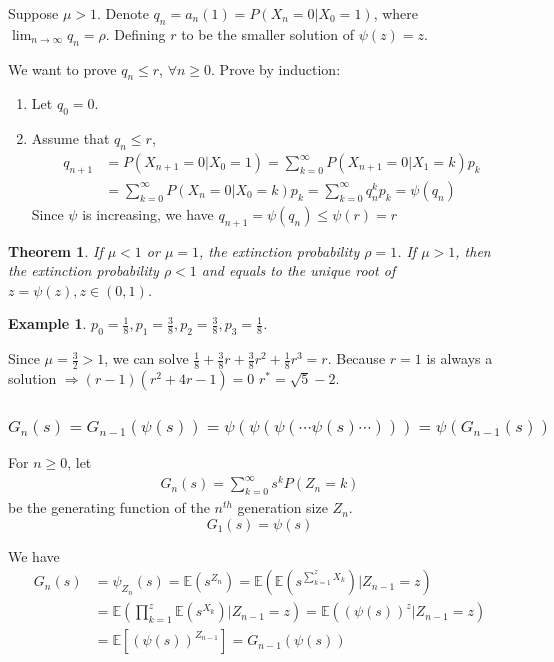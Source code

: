 \documentclass[11pt,a4paper]{article}
\newtheorem{theorem}{Theorem}
\newtheorem{example}{Example}
\begin{document}
Suppose $\mu>1$. Denote $q_n=a_n(1)=P(X_n=0|X_0=1)$, where $\lim_{n \rightarrow \infty}q_n=\rho$. Defining $r$ to be the smaller solution of $\psi(z)=z$.

We want to prove $q_n\leq r$, $\forall n\geq 0$. Prove by induction:
\begin{enumerate}
    \item Let $q_0=0$.
    \item Assume that $q_n\leq r$,
    \begin{equation}
        \begin{aligned}
            q_{n+1}&=P(X_{n+1}=0|X_0=1)=\sum_{k=0}^\infty P(X_{n+1}=0|X_1=k)p_k\\&=\sum_{k=0}^\infty P(X_{n}=0|X_0=k)p_k=\sum_{k=0}^\infty q_n^k p_k=\psi(q_n)
        \end{aligned}
        \nonumber
    \end{equation}
    Since $\psi$ is increasing, we have $q_{n+1}=\psi(q_n)\leq \psi(r)=r$
\end{enumerate}

\begin{theorem}
    If $\mu<1$ or $\mu=1$, the extinction probability $\rho=1$. If $\mu>1$, then the extinction probability $\rho<1$ and equals to the unique root of $z=\psi(z),z\in (0,1)$.
\end{theorem}

\begin{example}
    $p_0=\frac{1}{8},p_1=\frac{3}{8},p_2=\frac{3}{8},p_3=\frac{1}{8}$.
\end{example}
Since $\mu=\frac{3}{2}>1$, we can solve $\frac{1}{8}+\frac{3}{8}r+\frac{3}{8}r^2+\frac{1}{8}r^3=r$. Because $r=1$ is always a solution $\Rightarrow (r-1)(r^2+4r-1)=0$ $r^*=\sqrt{5}-2$.

\subsubsection{$G_n(s)=G_{n-1}(\psi(s))=\psi(\psi(\psi(\cdots\psi(s)\cdots)))=\psi(G_{n-1}(s))$}
For $n\geq 0$, let
\begin{equation}
    \begin{aligned}
        G_n(s)=\sum_{k=0}^\infty s^k P(Z_n=k)
    \end{aligned}
    \nonumber
\end{equation}
be the generating function of the $n^{th}$ generation size $Z_n$. $$G_1(s)=\psi(s)$$

We have
\begin{equation}
    \begin{aligned}
        G_n(s)&=\psi_{Z_n}(s)=\mathbb{E}(s^{Z_n})= \mathbb{E}\left(\mathbb{E}(s^{\sum_{k=1}^{z}X_k})|Z_{n-1}=z\right)\\
        &=\mathbb{E}\left(\prod_{k=1}^{z}\mathbb{E}(s^{X_k})|Z_{n-1}=z\right)=\mathbb{E}\left((\psi(s))^{z}|Z_{n-1}=z\right)\\
        &=\mathbb{E}\left[(\psi(s))^{Z_{n-1}}\right]=G_{n-1}(\psi(s))
    \end{aligned}
    \nonumber
\end{equation}
\end{document}
